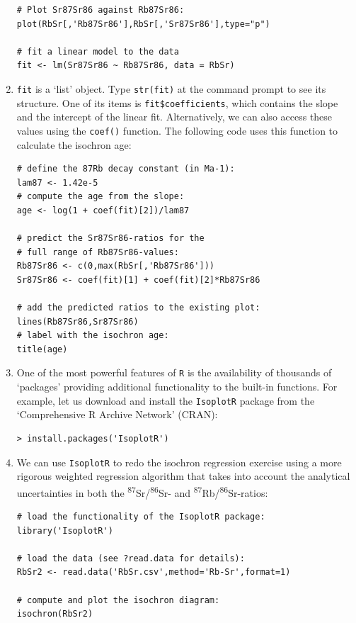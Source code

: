 \documentclass{book}
\begin{document}
\begin{enumerate}
\begin{verbatim}
# Plot Sr87Sr86 against Rb87Sr86:
plot(RbSr[,'Rb87Sr86'],RbSr[,'Sr87Sr86'],type="p")

# fit a linear model to the data
fit <- lm(Sr87Sr86 ~ Rb87Sr86, data = RbSr)
\end{verbatim}

\item \texttt{fit} is a `list' object. Type \texttt{str(fit)} at the
  command prompt to see its structure. One of its items is
  \verb|fit$coefficients|, which contains the slope and the intercept
  of the linear fit. Alternatively, we can also access these values
  using the \texttt{coef()} function. The following code uses this
  function to calculate the isochron age:

\begin{verbatim}
# define the 87Rb decay constant (in Ma-1):
lam87 <- 1.42e-5
# compute the age from the slope:
age <- log(1 + coef(fit)[2])/lam87

# predict the Sr87Sr86-ratios for the
# full range of Rb87Sr86-values:
Rb87Sr86 <- c(0,max(RbSr[,'Rb87Sr86']))
Sr87Sr86 <- coef(fit)[1] + coef(fit)[2]*Rb87Sr86

# add the predicted ratios to the existing plot:
lines(Rb87Sr86,Sr87Sr86)
# label with the isochron age: 
title(age)
\end{verbatim}

\item One of the most powerful features of \texttt{R} is the
  availability of thousands of `packages' providing additional
  functionality to the built-in functions.  For example, let us
  download and install the \texttt{IsoplotR} package from the
  `Comprehensive R Archive Network' (CRAN):

\begin{verbatim}
> install.packages('IsoplotR')
\end{verbatim}

\item We can use \texttt{IsoplotR} to redo the isochron regression
  exercise using a more rigorous weighted regression algorithm that
  takes into account the analytical uncertainties in both the
  \textsuperscript{87}Sr/\textsuperscript{86}Sr- and
  \textsuperscript{87}Rb/\textsuperscript{86}Sr-ratios:

\begin{verbatim}
# load the functionality of the IsoplotR package:
library('IsoplotR')

# load the data (see ?read.data for details):
RbSr2 <- read.data('RbSr.csv',method='Rb-Sr',format=1)

# compute and plot the isochron diagram:
isochron(RbSr2)
\end{verbatim}

\end{enumerate}
\end{document}
